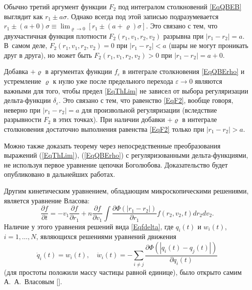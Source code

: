 \smallskip

\begin{remark}
Обычно третий аргумент функции $F_2$ под интегралом столкновений \eqref{EqQBEB} выглядит как $r_1\pm a\sigma$. Однако всегда под этой записью подразумевается $r_1\pm (a+0)\sigma\equiv\lim_{\varrho\to0}[r_1\pm (a+\varrho)\sigma]$. Это связано с тем, что двухчастичная функция плотности $F_2(r_1,v_1,r_2,v_2)$ разрывна при $|r_1-r_2|=a$. В~самом деле, $F_2(r_1,v_1,r_2,v_2)=0$ при $|r_1-r_2|<a$ (шары не могут проникать друг в друга), но может быть $F_2(r_1,v_1,r_2,v_2)>0$ при $|r_1-r_2|=a+0$.

Добавка $+\varrho$ в аргументах функции $f_\varepsilon$ в интеграле столкновения \eqref{EqQBErho} и устремление $\varrho$ к нулю уже после предельного перехода $\varepsilon\to0$ являются важными для того, чтобы предел \eqref{EqThLim} не зависел от выбора регуляризации дельта-функции $\delta_\varepsilon$. Это связано с тем, что равенство \eqref{EqF2}, вообще говоря, неверно при $|r_1-r_2|=a$ для произвольной регуляризации (вследствие разрывности $F_2$ в этих точках). При наличии добавки $+\varrho$ в интеграле столкновения достаточно выполнения равенства \eqref{EqF2} только при $|r_1-r_2|>a$.
\end{remark}

\smallskip

\begin{remark}Можно также доказать теорему через непосредственные преобразования выражений (\ref{EqThLim}), (\ref{EqQBErho}) с регуляризованными дельта-функциями, не используя первое уравнение цепочки Боголюбова. Доказательство будет опубликовано в дальнейших работах.
\end{remark}

\smallskip

Другим кинетическим уравнением, обладающим микроскопическими решениями, является уравнение Власова:
\begin{equation}\label{EqVlasov}
\frac{\partial f}{\partial t}=-v_1\frac{\partial f}{\partial r_1}+n\frac{\partial f}{\partial v_1}\int\frac{\partial\Phi(|r_1-r_2|)}{\partial r_1}f(r_2,v_2,t)dr_2dv_2.
\end{equation}
Наличие у этого уравнения решений вида \eqref{Eqfdelta}, где $q_i(t)$ и $w_i(t)$, $i=1,\ldots,N$, являющихся решениями уравнений движения
\begin{equation}\label{EqHamilt}
\dot q_i(t)=w_i(t),\quad
\dot w_i(t)=-\sum_{i\neq j}\frac{\partial\Phi(|q_i(t)-q_j(t)|)}{\partial q_i(t)}
\end{equation}
(для простоты положили массу частицы равной единице), было открыто самим А.~А.~Власовым [].

